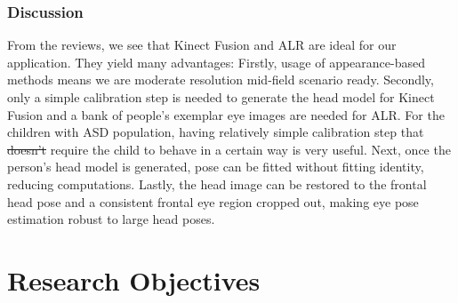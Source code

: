 \documentclass{ut-thesis}
\providecommand{\DIFaddtex}[1]{{\protect\color{blue}\uwave{#1}}} %
\providecommand{\DIFdeltex}[1]{{\protect\color{red}\sout{#1}}}                      %
\providecommand{\DIFaddbegin}{} %
\providecommand{\DIFaddend}{} %
\providecommand{\DIFdelbegin}{} %
\providecommand{\DIFdelend}{} %
\providecommand{\DIFadd}[1]{\texorpdfstring{\DIFaddtex{#1}}{#1}} %
\providecommand{\DIFdel}[1]{\texorpdfstring{\DIFdeltex{#1}}{}} %
\begin{document}
\subsection{Discussion}
From the reviews, we see that Kinect Fusion and ALR are ideal for our application.  They yield many advantages:  Firstly, usage of appearance-based methods means we are moderate resolution mid-field scenario ready.  Secondly, only a simple calibration step is needed to generate the head model for Kinect Fusion and a bank of people's exemplar eye images are needed for ALR.  For the children with ASD population, having relatively simple calibration step that \DIFdelbegin \DIFdel{doesn't }\DIFdelend \DIFaddbegin \DIFadd{does not }\DIFaddend require the child to behave in a certain way is very useful.  Next, once the person's head model is generated, pose can be fitted without fitting identity, reducing computations.  Lastly, the head image can be restored to the frontal head pose and a consistent frontal eye region cropped out, making eye pose estimation robust to large head poses.



\chapter{Research Objectives}
\end{document}
